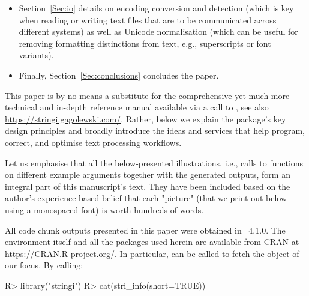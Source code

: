 \documentclass[nojss]{jss}
\begin{document}
\begin{itemize}
\item Section~\ref{Sec:io} details on encoding conversion and detection
(which is key when reading or writing text files that are to be communicated
across different systems) as well as Unicode normalisation
(which can be useful for removing formatting
distinctions from text, e.g., superscripts or font variants).

\item Finally, Section~\ref{Sec:conclusions} concludes the paper.
\end{itemize}



This paper is by no means a substitute for the comprehensive yet much
more technical and in-depth reference manual available via a call to
, see also
\url{https://stringi.gagolewski.com/}. Rather, below we explain
the package's key design principles and broadly introduce the ideas and
services that help program, correct, and optimise text processing workflows.

Let us emphasise that all the below-presented illustrations,
i.e., calls to  functions on different
example arguments together with the generated outputs, form an integral
part of this manuscript's text. They have been included based on
the author's experience-based belief that each "picture" (that we print
out below using a monospaced font) is worth hundreds of words.











\medskip
All code chunk outputs presented in this paper were obtained in
~4.1.0.
The  environment itself and all the packages used herein
are available from CRAN at \url{https://CRAN.R-project.org/}.
In particular,  can be called to
fetch the object of our focus.
By calling:


\begin{Schunk}
\begin{Sinput}
R> library("stringi")
R> cat(stri_info(short=TRUE))
\end{Sinput}
\end{Schunk}
\end{document}
